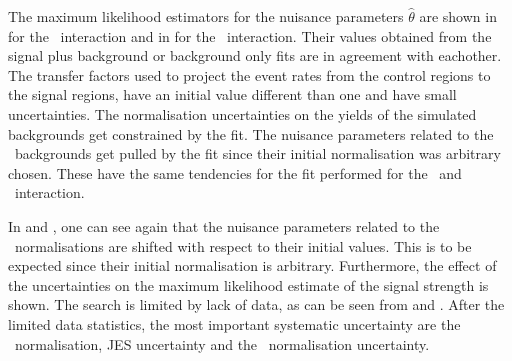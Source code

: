 The maximum likelihood estimators for the nuisance parameters $\hat{\theta}$ are shown in  for the \Zct\ interaction and in  for the \Zut\ interaction. Their values obtained from the signal plus background or background only fits are in agreement with eachother. The transfer factors used to project the event rates from the control regions to the signal regions, have an initial value different than one and have small uncertainties. The normalisation uncertainties on the yields of the simulated backgrounds get constrained by the fit. The nuisance parameters related to the \NPL\ backgrounds get pulled by the fit since their initial normalisation was arbitrary chosen. These have the same tendencies for the fit performed for the \Zut\ and \Zct\ interaction.  %

 In  and , one can see again that the nuisance parameters related to the \NPL\ normalisations are shifted with respect to their initial values. This is to be expected since their initial  normalisation is arbitrary. Furthermore, the effect of the uncertainties on the maximum likelihood estimate of the signal strength is shown. The search is limited by lack of data, as can be seen from  and . After the limited data statistics, the most important systematic uncertainty are the \ttZ\ normalisation, JES uncertainty and the \NPL\ normalisation uncertainty. 
 
 


